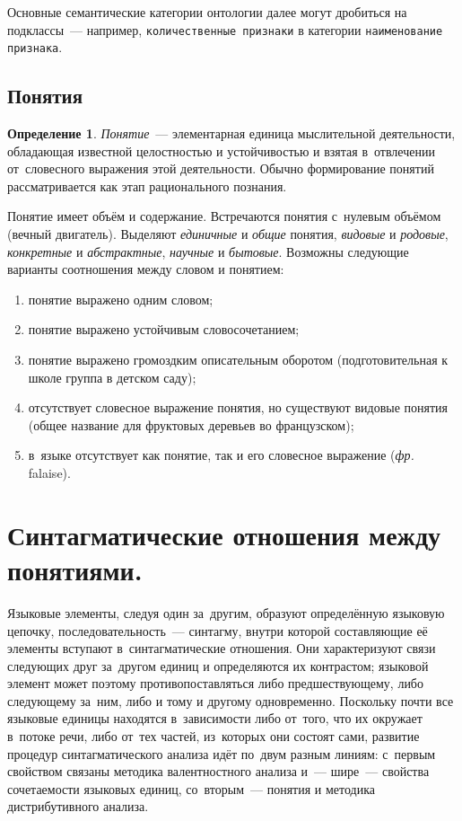 \documentclass[12pt]{article}
\theoremstyle{definition}
\newtheorem*{defn}{Определение}
\theoremstyle{remark}
\numberwithin{equation}{section}
\begin{document}
Основные семантические категории онтологии далее могут дробиться на подклассы~--- например, \texttt{количественные признаки} в категории \texttt{наименование признака}.

\subsection{Понятия}
\label{subsec:Concept}
\begin{defn}
	\textsl{Понятие}~--- элементарная единица мыслительной деятельности,
    обладающая известной целостностью и устойчивостью и взятая в~отвлечении
    от~словесного выражения этой деятельности. Обычно формирование понятий
    рассматривается как этап рационального познания.
\end{defn}
Понятие имеет объём и содержание. Встречаются понятия с~нулевым объёмом
(вечный двигатель). Выделяют \textit{единичные} и \textit{общие} понятия,
\textit{видовые} и \textit{родовые}, \textit{конкретные} и \textit{абстрактные},
\textit{научные} и \textit{бытовые}. Возможны следующие варианты соотношения
между словом и понятием:
\begin{enumerate}
    \item понятие выражено одним словом;
    \item понятие выражено устойчивым словосочетанием;
    \item понятие выражено громоздким описательным оборотом
    (подготовительная к школе группа в детском саду);
    \item отсутствует словесное выражение понятия, но существуют видовые
    понятия (общее название для фруктовых деревьев во французском);
    \item в~языке отсутствует как понятие, так и его словесное выражение
    (\textit{фр.} falaise).
\end{enumerate}

\section{Синтагматические отношения между понятиями.}
Языковые элементы, следуя один за~другим, образуют определённую
языковую цепочку, последовательность~--- синтагму, внутри которой
составляющие её элементы вступают в~синтагматические отношения.
Они характеризуют связи следующих друг за~другом единиц и определяются
их контрастом; языковой элемент может поэтому противопоставляться либо
предшествующему, либо следующему за~ним, либо и тому и другому одновременно.
Поскольку почти все языковые единицы находятся в~зависимости либо от~того,
что их окружает в~потоке речи, либо от~тех частей, из~которых они состоят
сами, развитие процедур синтагматического анализа идёт по~двум разным линиям:
с~первым свойством связаны методика валентностного анализа и~--- шире~---
свойства сочетаемости языковых единиц, со~вторым~--- понятия и методика
дистрибутивного анализа.
\end{document}
